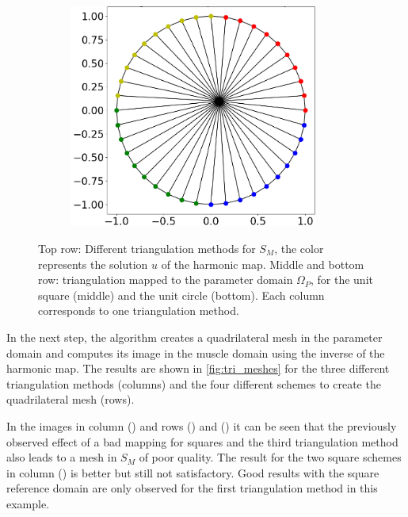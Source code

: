\begin{figure}
\begin{subfigure}[t]{0.31\textwidth}
    \label{fig:w_10}%
  \end{subfigure}
  \quad
  \begin{subfigure}[t]{0.31\textwidth}%
    \centering%
    \includegraphics[width=0.9\textwidth, trim=37mm 14mm 6mm 6mm, clip, angle=225,origin=c]{images/fiber_creation/mesh_plots/out_2_0_0_tri.png}%
    \label{fig:w_20}%
  \end{subfigure}
  
  \caption{Top row: Different triangulation methods for $S_M$, the color represents the solution $u$ of the harmonic map. Middle and bottom row: triangulation mapped to the parameter domain $\Omega_P$, for the unit square (middle) and the unit circle (bottom). Each column corresponds to one triangulation method.}%
  \label{fig:tri_triangulations}%
\end{figure}%



In the next step, the algorithm creates a quadrilateral mesh in the parameter domain and computes its image in the muscle domain using the inverse of the harmonic map. The results are shown in \cref{fig:tri_meshes} for the three different triangulation methods (columns) and the four different schemes to create the quadrilateral mesh (rows).

In the images in column () and rows () and () it can be seen that the previously observed effect of a bad mapping for squares and the third triangulation method also leads to a mesh in $S_M$ of poor quality.
The result for the two square schemes in column () is better but still not satisfactory. Good results with the square reference domain are only observed for the first triangulation method in this example.

